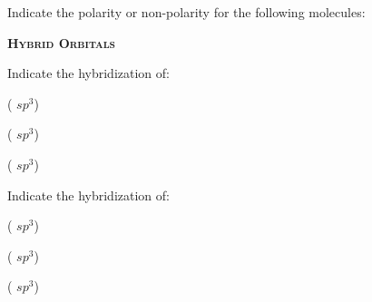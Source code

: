 \documentclass[main.tex]{subfiles}
\begin{document}
\begin{multicols*}{2}
\begin{question}[ID=\the\value{numA}]
Indicate the polarity or non-polarity for the following molecules:
\begin{inparaenum}[(a)]
\item  {}	%
\item  {}	%
\end{inparaenum}
\end{question}
\begin{solution} 
 \begin{inparaenum}[(a)]
\item  {}	%
\item  {}	%
 \end{inparaenum}\hspace{0.1cm}\end{solution}



{\raggedright\textsc{\textbf{Hybrid Orbitals}}\par}
\begin{question}[ID=\the\value{numA}]
Indicate the hybridization of:
\begin{inparaenum}[(a)]
\item {}  %
\item {} %
\item {}%
\end{inparaenum}
\end{question}
\begin{solution} 
 \begin{inparaenum}[(a)]
\item {}   ( $sp^3$)
\item {}  ( $sp^3$)
\item {} ( $sp^3$)
 \end{inparaenum}\hspace{0.1cm}\end{solution}
\begin{question}[ID=\the\value{numA}]
Indicate the hybridization of:
\begin{inparaenum}[(a)]
\item {}  %
\item {} %
\item {}%
\end{inparaenum}
\end{question}
\begin{solution} 
 \begin{inparaenum}[(a)]
\item {}   ( $sp^3$)
\item {}  ( $sp^3$)
\item {} ( $sp^3$)
 \end{inparaenum}\hspace{0.1cm}\end{solution}


\end{multicols*}
\end{document}
